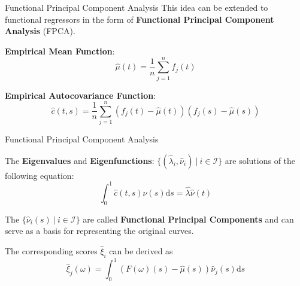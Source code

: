 \documentclass{beamer}
\begin{document}
	\begin{frame}{Functional Principal Component Analysis}
		This idea can be extended to functional regressors in the form of \textbf{Functional Principal Component Analysis} (FPCA).
		\vspace{0.2cm}
		
		\textbf{Empirical Mean Function}:
		$$\hat{\mu}(t) = \frac{1}{n}\sum_{j = 1}^{n}f_j(t)$$

		\textbf{Empirical Autocovariance Function}:
		$$\hat{c}(t,s) = \frac{1}{n} \sum_{j = 1}^{n} \left(f_j(t) - \hat{\mu}(t)\right) \left(f_j(s) - \hat{\mu}(s)\right)$$

	\end{frame}

	\begin{frame}{Functional Principal Component Analysis}
	
		The \textbf{Eigenvalues} and \textbf{Eigenfunctions}: $\{(\hat{\lambda}_i, \hat{\nu}_i) \: \vert \: i \in \mathcal{I}\}$  are solutions of the following equation:
		$$ \int_{0}^{1}\hat{c}(t,s)\hat{\nu}(s) \mathrm{d}s = \hat{\lambda} \hat{\nu}(t) $$
		\vspace{0.2cm}
		
		The $\{\hat{\nu}_i(s) \: \vert \: i \in \mathcal{I}\}$ are called \textbf{Functional Principal Components} and can serve as a basis for representing the original curves. 
		\vspace{0.2cm}
		
		The corresponding scores $\hat{\xi}_i$ can be derived as
		$$\hat{\xi}_j(\omega) = \int_{0}^{1} (F(\omega)(s) - \hat{\mu}(s)) \hat{\nu}_j(s) \mathrm{d}s$$
		
	\end{frame}
\end{document}
